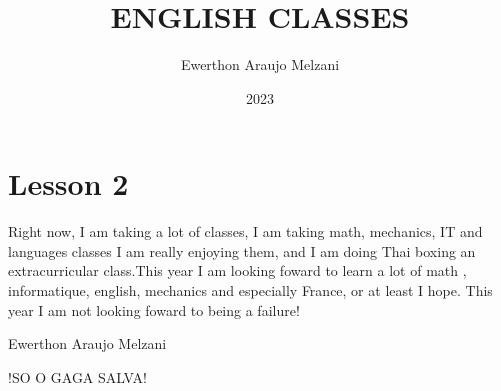 \documentclass{article}
\title{ENGLISH CLASSES}
\author{Ewerthon Araujo Melzani}
\date{2023}
\begin{document}
\maketitle

\section*{Lesson 2}

\vspace*{1.5 cm}


    Right now, I am taking a lot of classes, I am taking math, mechanics, IT and languages classes
I am really enjoying them, and I am doing Thai boxing an extracurricular class.This year I am looking foward to learn a lot of math
, informatique, english, mechanics and especially France, or at least I hope.
This year I am not looking foward to being a failure!





\vspace*{1.5 cm}



\LARGE{Ewerthon Araujo Melzani}

\vspace*{1.5 cm}

\huge{!SO O GAGA SALVA!}
\end{document}
